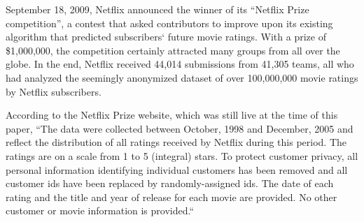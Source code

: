 \documentclass[10pt,journal,compsoc]{IEEEtran}
\begin{document}




% 
% 
% 
% 
 September 18, 2009, Netflix announced the winner of its “Netflix Prize competition”, a contest that asked contributors to improve upon its existing algorithm that predicted subscribers` future movie ratings.  With a prize of \$1,000,000, the competition certainly attracted many groups from all over the globe.  In the end, Netflix received 44,014 submissions from 41,305 teams, all who had analyzed the seemingly anonymized dataset of over 100,000,000 movie ratings by Netflix subscribers.

According to the Netflix Prize website, which was still live at the time of this paper, ``The data were collected between October, 1998 and December, 2005 and reflect the distribution of all ratings received by Netflix during this period. The ratings are on a scale from 1 to 5 (integral) stars. To protect customer privacy, all personal information identifying individual customers has been removed and all customer ids have been replaced by randomly-assigned ids. The date of each rating and the title and year of release for each movie are provided. No other customer or movie information is provided.``
	
\end{document}
